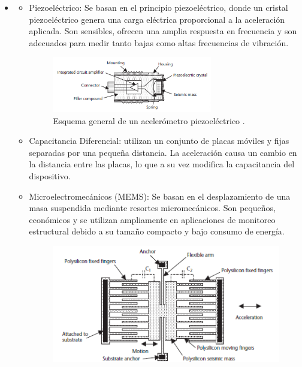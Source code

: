 \begin{itemize}
        \item \begin{itemize}
            \item Piezoeléctrico: Se basan en el principio piezoeléctrico, donde un cristal piezoeléctrico genera una carga eléctrica proporcional a la aceleración aplicada. Son sensibles, ofrecen una amplia respuesta en frecuencia y son adecuados para medir tanto bajas como altas frecuencias de vibración. 
            \begin{figure}[H]
                \centering
                \includegraphics[width = 0.7\textwidth]{imagenes/cap1_marcoteo/AccelerometerPiezo.png}
                \caption{Esquema general de un acelerómetro piezoeléctrico \citep{dunn2005introduction}.}
                \label{fig:acc-pie}
            \end{figure}
            \item Capacitancia Diferencial: utilizan un conjunto de placas móviles y fijas separadas por una pequeña distancia. La aceleración causa un cambio en la distancia entre las placas, lo que a su vez modifica la capacitancia del dispositivo.
            \item Microelectromecánicos (MEMS): Se basan en el desplazamiento de una masa suspendida mediante resortes micromecánicos. Son pequeños, económicos y se utilizan ampliamente en aplicaciones de monitoreo estructural debido a su tamaño compacto y bajo consumo de energía.
            \begin{figure}[H]
                \centering
                \begin{minipage}{0.45\textwidth}
                    \centering
                    \includegraphics[width=1\textwidth]{imagenes/cap1_marcoteo/AccelerometerMEMS.png}

\end{minipage}
\end{figure}
\end{itemize}
\end{itemize}
